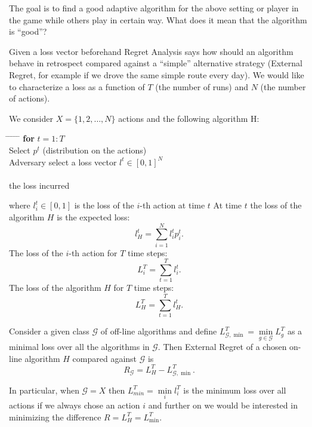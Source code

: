 The goal is to find a good adaptive algorithm for the above setting or player in the game while others play in certain way. What does it mean that the algorithm is ``good''? 
\begin{definition}
Given a loss vector beforehand Regret Analysis says how should an algorithm behave in retrospect compared against a ``simple'' alternative strategy (External Regret, for example if we drove the same simple route every day). We would like to characterize a loss as a function of $T$ (the number of runs) and $N$ (the number of actions).
\end{definition}
\begin{definition}
We consider $X=\{1,2,\ldots,N\}$ actions and the following algorithm H:
\begin{tabbing}
\hspace*{.25in} \= \hspace*{.25in} \= \hspace*{.25in} \= \hspace*{.25in} \= \hspace*{.25in} \=\kill
\> {\bf for} $t=1:T$\\
\>\> Select $p^t$ (distribution on the actions)\\
\>\> Adversary select a loss vector $l^t\in [0,1]^N$\\
 \\
 the loss incurred
\end{tabbing}
where $l^t_i\in [0,1]$ is the loss of the $i$-th action at time $t$
At time $t$ the loss of the algorithm $H$ is the expected loss:
$$
l^t_H=\sum\limits_{i=1}^N l^t_ip^t_i.
$$
The loss of the $i$-th action for $T$ time steps:
$$
L^T_i=\sum\limits_{t=1}^T l^t_i.
$$
The loss of the algorithm $H$ for $T$ time steps:
$$
L^T_H=\sum\limits_{t=1}^T l^t_H.
$$
\end{definition}
\begin{definition}
Consider a given class $\mathcal{G}$ of off-line algorithms and define $L^T_{\mathcal{G},\min}=\min\limits_{g\in\mathcal{G}}L^T_g$ as a minimal loss over all the algorithms in $\mathcal{G}$. Then External Regret of a chosen on-line algorithm $H$ compared against $\mathcal{G}$ is 
$$
R_{\mathcal{G}}=L^T_H-L^T_{\mathcal{G},\min}.
$$
\end{definition}
In particular, when $\mathcal{G}=X$ then $L^T_{min}=\min\limits_i l^T_i$ is the minimum loss over all actions if we always chose an action $i$ and further on we would be interested in minimizing the difference $R=L^T_H=L^T_{\min}$.

